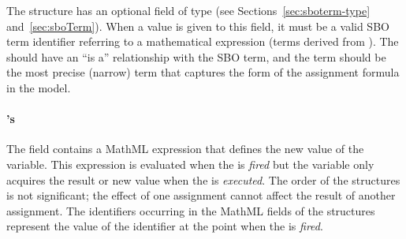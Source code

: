 The \EventAssignment structure has an optional 
field of type  (see
Sections~\ref{sec:sboterm-type} and~\ref{sec:sboTerm}).  When a
value is given to this field, it must be a valid SBO term
identifier referring to a mathematical expression (\ie terms
derived from \sbomathformula).  The \EventAssignment should have
an ``is a'' relationship with the SBO term, and the term should be
the most precise (narrow) term that captures the form of the
assignment formula in the model.


\paragraph{'s }

The  field contains a MathML expression that defines
the new value of the variable. This expression is evaluated when
the \Event is \emph{fired} but the variable only acquires the
result or new value when the \Event is \emph{executed}. The order
of the \EventAssignment structures is not significant; the effect
of one assignment cannot affect the result of another assignment.
The identifiers occurring in the MathML  fields of the
\EventAssignment structures represent the value of the identifier
at the point when the \Event is \emph{fired}.


